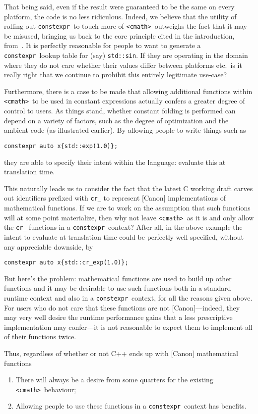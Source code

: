 \documentclass[prd,twocolumn,amsmath,amssymb,nofootinbib,eqsecnum]{revtex4-1}
\newcommand{\constexpr}{\code{constexpr}\xspace}
\newcommand{\code}[1]{{\tt #1}}
\newcommand{\header}[1]{{\tt <#1>}}
\newcommand{\cmath}{\header{cmath}}
\begin{document}
That being said, even if the result were guaranteed to be the same on every platform, the code is no less ridiculous. Indeed, we believe that the utility of rolling out \constexpr\ to touch more of \cmath\ outweighs the fact that it may be misused, bringing us back to the core principle cited in the introduction, from~\cite{DandE}.
It is perfectly reasonable for people to want to generate a \constexpr\ lookup table for (say) \code{std::sin}. If they are operating in the domain where they do not care whether their values differ between platforms etc.\ is it really right that we continue to prohibit this entirely legitimate use-case?

Furthermore, there is a case to be made that allowing additional functions within \cmath\ to be used in constant expressions actually confers a greater degree of control to users. As things stand, whether constant folding is performed can depend on a variety of factors, such as the degree of optimization and the ambient code (as illustrated earlier). By allowing people to write things such as
\begin{verbatim}
constexpr auto x{std::exp(1.0)};
\end{verbatim}
 they are able to specify their intent within the language: evaluate this at translation time.

This naturally leads us to consider the fact that the latest C working draft carves out identifiers prefixed with \code{cr\_} to represent [Canon] implementations of mathematical functions. If we are to work on the assumption that such functions will at some point materialize, then why not leave \cmath\ as it is and only allow the \code{cr\_} functions in a \constexpr\ context? After all, in the above example the intent to evaluate at translation time could be perfectly well specified, without any appreciable downside, by
\begin{verbatim}
constexpr auto x{std::cr_exp(1.0)};
\end{verbatim}
But here's the problem: mathematical functions are used to build up other functions and it may be desirable to use such functions both in a standard runtime context and also in a \constexpr\ context, for all the reasons given above. For users who do not care that these functions are not [Canon]---indeed, they may very well desire the runtime performance gains that a less prescriptive implementation may confer---it is not reasonable to expect them to implement all of their functions twice.

Thus, regardless of whether or not C++ ends up with [Canon] mathematical functions
\begin{enumerate}
	\item There will always be a desire from some quarters for the existing \cmath\ behaviour;
	
	\item Allowing people to use these functions in a \constexpr\ context has benefits.
\end{enumerate}
\end{document}
